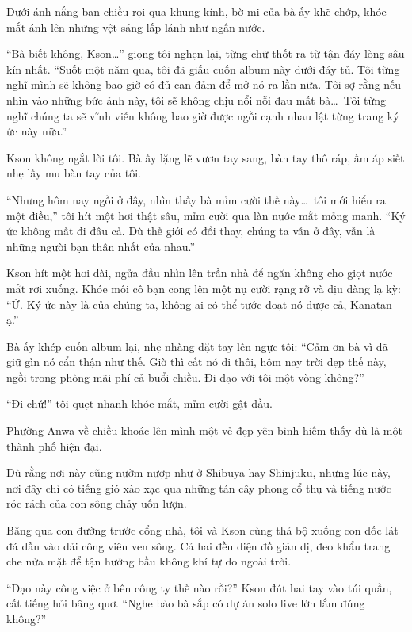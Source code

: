 \documentclass[../main.tex]{subfiles}
\begin{document}
Dưới ánh nắng ban chiều rọi qua khung kính, bờ mi của bà ấy khẽ chớp, khóe mắt ánh lên những vệt sáng lấp lánh như ngấn nước.

``Bà biết không, Kson\dots'' giọng tôi nghẹn lại, từng chữ thốt ra từ tận đáy lòng sâu kín nhất. ``Suốt một năm qua, tôi đã giấu cuốn album này dưới đáy tủ. Tôi từng nghĩ mình sẽ không bao giờ có đủ can đảm để mở nó ra lần nữa. Tôi sợ rằng nếu nhìn vào những bức ảnh này, tôi sẽ không chịu nổi nỗi đau mất bà\dots\ Tôi từng nghĩ chúng ta sẽ vĩnh viễn không bao giờ được ngồi cạnh nhau lật từng trang ký ức này nữa.''

Kson không ngắt lời tôi. Bà ấy lặng lẽ vươn tay sang, bàn tay thô ráp, ấm áp siết nhẹ lấy mu bàn tay của tôi.

``Nhưng hôm nay ngồi ở đây, nhìn thấy bà mỉm cười thế này\dots\ tôi mới hiểu ra một điều,'' tôi hít một hơi thật sâu, mỉm cười qua làn nước mắt mỏng manh. ``Ký ức không mất đi đâu cả. Dù thế giới có đổi thay, chúng ta vẫn ở đây, vẫn là những người bạn thân nhất của nhau.''

Kson hít một hơi dài, ngửa đầu nhìn lên trần nhà để ngăn không cho giọt nước mắt rơi xuống. Khóe môi cô bạn cong lên một nụ cười rạng rỡ và dịu dàng lạ kỳ: ``Ừ. Ký ức này là của chúng ta, không ai có thể tước đoạt nó được cả, Kanatan ạ.''

Bà ấy khép cuốn album lại, nhẹ nhàng đặt tay lên ngực tôi: ``Cảm ơn bà vì đã giữ gìn nó cẩn thận như thế. Giờ thì cất nó đi thôi, hôm nay trời đẹp thế này, ngồi trong phòng mãi phí cả buổi chiều. Đi dạo với tôi một vòng không?''

``Đi chứ!'' tôi quẹt nhanh khóe mắt, mỉm cười gật đầu.

\ct

Phường Anwa về chiều khoác lên mình một vẻ đẹp yên bình hiếm thấy dù là một thành phố hiện đại.

Dù rằng nơi này cũng nườm nượp như ở Shibuya hay Shinjuku, nhưng lúc này, nơi đây chỉ có tiếng gió xào xạc qua những tán cây phong cổ thụ và tiếng nước róc rách của con sông chảy uốn lượn.

Băng qua con đường trước cổng nhà, tôi và Kson cùng thả bộ xuống con dốc lát đá dẫn vào dải công viên ven sông. Cả hai đều diện đồ giản dị, đeo khẩu trang che nửa mặt để tận hưởng bầu không khí tự do ngoài trời.

``Dạo này công việc ở bên công ty thế nào rồi?'' Kson đút hai tay vào túi quần, cất tiếng hỏi bâng quơ. ``Nghe bảo bà sắp có dự án solo live lớn lắm đúng không?''
\end{document}
